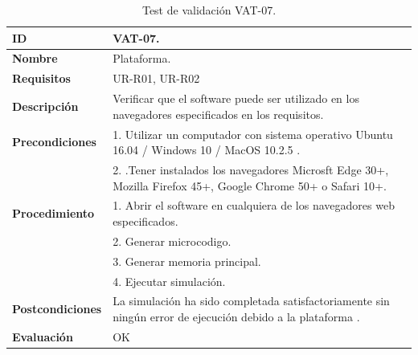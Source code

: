 \begin{center}
\begin{table}[htb]
\centering
\caption{Test de validación VAT-07.}
\begin{tabular}{@{}p{2.5cm} p{9cm}@{}} 
\toprule
\textbf{ID} 					& VAT-07. \\
\midrule
\textbf{Nombre} 				& Plataforma. \\
\midrule
\textbf{Requisitos} 		& UR-R01, UR-R02\\
\midrule
\textbf{Descripción} 		& Verificar que el \gls{software} puede ser utilizado en los navegadores especificados en los requisitos. \\
\midrule
\textbf{Precondiciones}		& 1. Utilizar un computador con sistema operativo Ubuntu 16.04 / Windows 10 / MacOS 10.2.5 .\\
							& 2. .Tener instalados los navegadores Microsft Edge 30+, Mozilla Firefox 45+, Google Chrome 50+ o Safari 10+. \\
\midrule
\textbf{Procedimiento}			& 1. Abrir el \gls{software} en cualquiera de los navegadores web especificados. \\
							& 2. Generar \gls{microcodigo}.\\
							& 3. Generar memoria principal.\\
							& 4. Ejecutar simulación.\\
\midrule
\textbf{Postcondiciones} 		&  La simulación ha sido completada satisfactoriamente sin ningún error de ejecución debido a la plataforma .\\
\midrule
\textbf{Evaluación} 			& OK \\
\bottomrule
\end{tabular}
\label{tab:vat-07}
\end{table}
\end{center}

